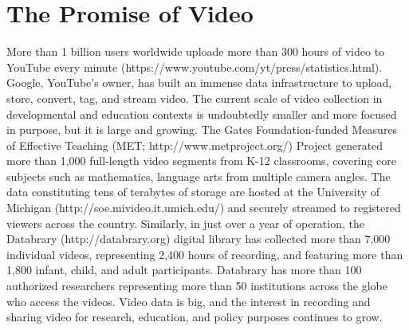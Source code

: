 \documentclass[letterpaper,man,natbib]{apa6}
\begin{document}
\section{The Promise of Video}

More than 1 billion users worldwide uploade more than 300 hours of video to YouTube every minute (https://www.youtube.com/yt/press/statistics.html). 
Google, YouTube's owner, has built an immense data infrastructure to upload, store, convert, tag, and stream video. 
The current scale of video collection in developmental and education contexts is undoubtedly smaller and more focused in purpose, but it is large and growing. 
The Gates Foundation-funded Measures of Effective Teaching (MET; http://www.metproject.org/) Project generated more than 1,000 full-length video segments from K-12 classrooms, covering core subjects such as mathematics, language arts from multiple camera angles. 
The data constituting tens of terabytes of storage are hosted at the University of Michigan (http://soe.mivideo.it.umich.edu/) and securely streamed to registered viewers across the country.
Similarly, in just over a year of operation, the Databrary (http://databrary.org) digital library has collected more than 7,000 individual videos, representing 2,400 hours of recording, and featuring more than 1,800 infant, child, and adult participants.
Databrary has more than 100 authorized researchers representing more than 50 institutions across the globe who access the videos.
Video data is big, and the interest in recording and sharing video for research, education, and policy purposes continues to grow.
\end{document}
